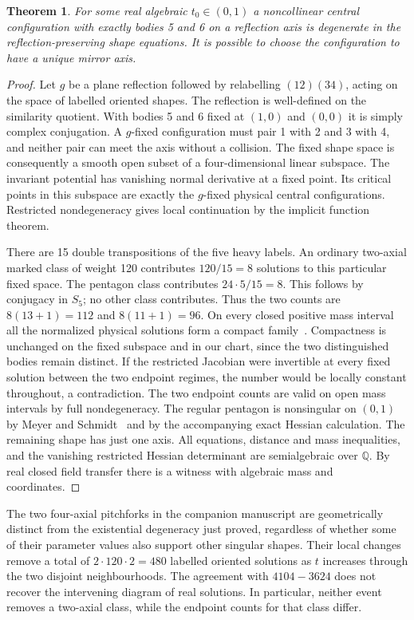 \documentclass[11pt]{article}
\newtheorem{theorem}{Theorem}
\begin{document}
\begin{theorem}
For some real algebraic $t_0\in(0,1)$ a noncollinear central
configuration with exactly bodies 5 and 6 on a reflection axis is
degenerate in the reflection-preserving shape equations. It is possible
to choose the configuration to have a unique mirror axis.
\end{theorem}
\begin{proof}
Let $g$ be a plane reflection followed by relabelling $(12)(34)$,
acting on the space of labelled oriented shapes. The reflection is
well-defined on the similarity quotient. With bodies 5 and 6 fixed
at $(1,0)$ and $(0,0)$ it is simply complex conjugation. A $g$-fixed
configuration must pair 1 with 2 and 3 with 4, and neither pair can
meet the axis without a collision. The fixed shape space is consequently
a smooth open subset of a four-dimensional linear subspace.
The invariant potential has vanishing normal derivative at a fixed
point. Its critical points in this subspace are exactly the $g$-fixed
physical central configurations. Restricted nondegeneracy gives local
continuation by the implicit function theorem.

There are 15 double transpositions of the five heavy labels. An ordinary
two-axial marked class of weight 120 contributes $120/15=8$ solutions
to this particular fixed space. The pentagon class contributes
$24\cdot5/15=8$. This follows by conjugacy in $S_5$; no other class
contributes. Thus the two counts are $8(13+1)=112$ and
$8(11+1)=96$. On every closed positive mass interval all the normalized
physical solutions form a compact family~\cite{Small}. Compactness is
unchanged on the fixed subspace and in our chart, since the two
distinguished bodies remain distinct. If the restricted Jacobian were
invertible at every fixed solution between the two endpoint regimes,
the number would be locally constant throughout, a contradiction.
The two endpoint counts are valid on open mass intervals by full
nondegeneracy. The regular pentagon is nonsingular on $(0,1)$ by
Meyer and Schmidt~\cite{MS} and by the accompanying exact Hessian
calculation. The remaining shape has just one axis. All equations,
distance and mass inequalities, and the vanishing restricted Hessian
determinant are semialgebraic over $\mathbb Q$. By real closed field
transfer there is a witness with algebraic mass and coordinates.
\end{proof}
The two four-axial pitchforks in the companion manuscript are geometrically
distinct from the existential degeneracy just proved, regardless of whether some of
their parameter values also support other singular shapes. Their local
changes remove a total of $2\cdot120\cdot2=480$ labelled oriented solutions
as $t$ increases through the two disjoint neighbourhoods. The agreement
with $4104-3624$ does not recover the intervening diagram of real solutions.
In particular, neither event removes a two-axial class, while the endpoint
counts for that class differ.
\end{document}
